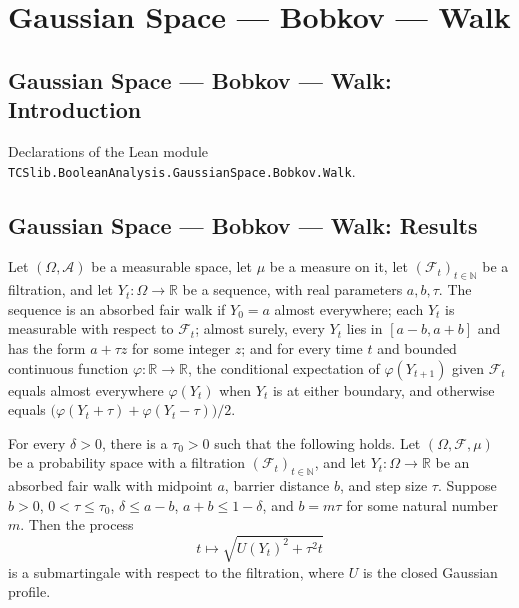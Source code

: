 \section{Gaussian Space --- Bobkov --- Walk}
\subsection*{Gaussian Space --- Bobkov --- Walk: Introduction}

Declarations of the Lean module \texttt{TCSlib.BooleanAnalysis.GaussianSpace.Bobkov.Walk}.

\subsection*{Gaussian Space --- Bobkov --- Walk: Results}

\begin{definition}
\label{BooleanAnalysis.GaussianSpace.IsAbsorbedFairWalk}
\leanok
Let $(\Omega,\mathcal{A})$ be a measurable space, let $\mu$ be a measure on it, let
$(\mathcal{F}_t)_{t\in\mathbb{N}}$ be a filtration, and let $Y_t:\Omega\to\mathbb{R}$ be
a sequence, with real parameters $a,b,\tau$. The sequence is an absorbed fair walk if
$Y_0=a$ almost everywhere; each $Y_t$ is measurable with respect to $\mathcal{F}_t$;
almost surely, every $Y_t$ lies in $[a-b,a+b]$ and has the form $a+\tau z$ for some
integer $z$; and for every time $t$ and bounded continuous function
$\varphi:\mathbb{R}\to\mathbb{R}$, the conditional expectation of $\varphi(Y_{t+1})$
given $\mathcal{F}_t$ equals almost everywhere $\varphi(Y_t)$ when $Y_t$ is at either
boundary, and otherwise equals $\bigl(\varphi(Y_t+\tau)+\varphi(Y_t-\tau)\bigr)/2$.
\end{definition}

\begin{theorem}
\label{BooleanAnalysis.GaussianSpace.bobkov_walk_submartingale}
\leanok
{}
For every $\delta>0$, there is a $\tau_0>0$ such that the following holds. Let
$(\Omega,\mathcal F,\mu)$ be a probability space with a filtration $(\mathcal
F_t)_{t\in\mathbb N}$, and let $Y_t:\Omega\to\mathbb R$ be an absorbed fair walk with
midpoint $a$, barrier distance $b$, and step size $\tau$. Suppose $b>0$,
$0<\tau\le\tau_0$, $\delta\le a-b$, $a+b\le1-\delta$, and $b=m\tau$ for some natural
number $m$. Then the process
\[
 t\longmapsto \sqrt{U(Y_t)^2+\tau^2t}
\]
is a submartingale with respect to the filtration, where $U$ is the closed Gaussian
profile.
\end{theorem}
